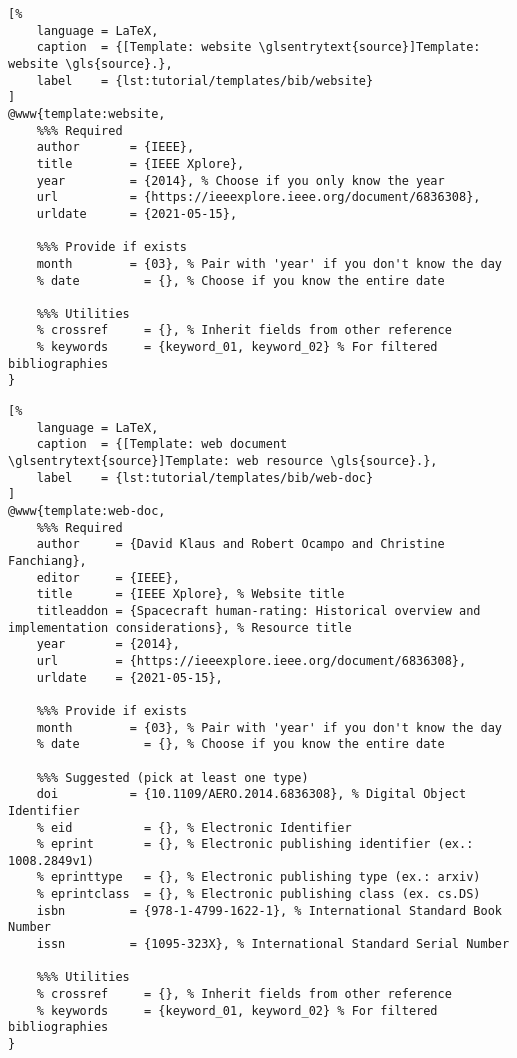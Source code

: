 \newpage
\begin{lstlisting}[%
    language = LaTeX,
    caption  = {[Template: website \glsentrytext{source}]Template: website \gls{source}.},
    label    = {lst:tutorial/templates/bib/website}
]
@www{template:website,
    %%% Required
    author       = {IEEE},
    title        = {IEEE Xplore},
    year         = {2014}, % Choose if you only know the year
    url          = {https://ieeexplore.ieee.org/document/6836308},
    urldate      = {2021-05-15},
    
    %%% Provide if exists
    month        = {03}, % Pair with 'year' if you don't know the day
    % date         = {}, % Choose if you know the entire date
    
    %%% Utilities
    % crossref     = {}, % Inherit fields from other reference
    % keywords     = {keyword_01, keyword_02} % For filtered bibliographies
}
\end{lstlisting}

\begin{lstlisting}[%
    language = LaTeX,
    caption  = {[Template: web document \glsentrytext{source}]Template: web resource \gls{source}.},
    label    = {lst:tutorial/templates/bib/web-doc}
]
@www{template:web-doc,
    %%% Required
    author     = {David Klaus and Robert Ocampo and Christine Fanchiang},
    editor     = {IEEE},
    title      = {IEEE Xplore}, % Website title
    titleaddon = {Spacecraft human-rating: Historical overview and implementation considerations}, % Resource title
    year       = {2014},
    url        = {https://ieeexplore.ieee.org/document/6836308},
    urldate    = {2021-05-15},
    
    %%% Provide if exists
    month        = {03}, % Pair with 'year' if you don't know the day
    % date         = {}, % Choose if you know the entire date
    
    %%% Suggested (pick at least one type)
    doi          = {10.1109/AERO.2014.6836308}, % Digital Object Identifier
    % eid          = {}, % Electronic Identifier
    % eprint       = {}, % Electronic publishing identifier (ex.: 1008.2849v1)
    % eprinttype   = {}, % Electronic publishing type (ex.: arxiv)
    % eprintclass  = {}, % Electronic publishing class (ex. cs.DS)
    isbn         = {978-1-4799-1622-1}, % International Standard Book Number
    issn         = {1095-323X}, % International Standard Serial Number
    
    %%% Utilities
    % crossref     = {}, % Inherit fields from other reference
    % keywords     = {keyword_01, keyword_02} % For filtered bibliographies
}
\end{lstlisting}

